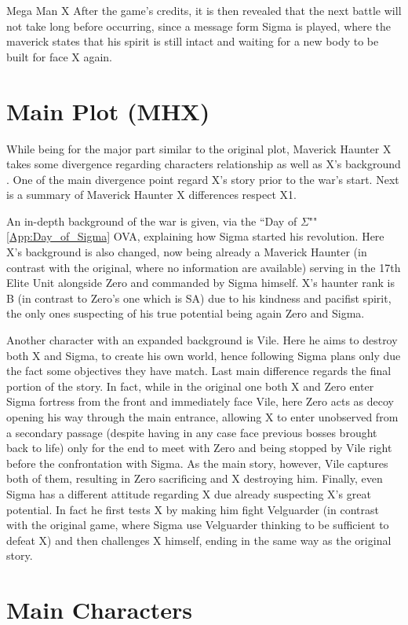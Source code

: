 \documentclass[openany]{report}
\begin{document}
\begin{chapter}{Mega Man X}
	After the game's credits, it is then revealed that the next battle will not take long before occurring, since a message form Sigma is played, where the maverick states that his spirit is still intact and waiting for a new body to be built for face X again.
	\section{Main Plot (MHX)}
	While being for the major part similar to the original plot, Maverick Haunter X takes some divergence regarding characters relationship as well as X's background \cite{wiki:MM_MHX}. One of the main divergence point regard X's story prior to the war's start. Next is a summary of Maverick Haunter X differences respect X1.
	
	An in-depth background of the war is given, via the ``Day of $\Sigma$""\ref{App:Day_of_Sigma} OVA, explaining how Sigma started his revolution. Here X's background is also changed, now being already a Maverick Haunter (in contrast with the original, where no information are available) serving in the 17th Elite Unit alongside Zero and commanded by Sigma himself. X's haunter rank is B (in contrast to Zero's one which is SA) due to his kindness and pacifist spirit, the only ones suspecting of his true potential being again Zero and Sigma. 
	
	Another character with an expanded background is Vile. Here he aims to destroy both X and Sigma, to create his own world, hence following Sigma plans only due the fact some objectives they have match.
	Last main difference regards the final portion of the story\cite{wiki:MM_MHX_script}. In fact, while in the original one both X and Zero enter Sigma fortress from the front and immediately face Vile, here Zero acts as decoy opening his way through the main entrance, allowing X to enter unobserved from a secondary passage (despite having in any case face previous bosses brought back to life) only for the end to meet with Zero and being stopped by Vile right before the confrontation with Sigma. As the main story, however, Vile captures both of them, resulting in Zero sacrificing and X destroying him. Finally, even Sigma has a different attitude regarding X due already suspecting X's great potential. In fact he first tests X by making him fight Velguarder (in contrast with the original game, where Sigma use Velguarder thinking to be sufficient to defeat X) and then challenges X himself, ending in the same way as the original story.	
	
	\section{Main Characters}

\end{chapter}
\end{document}
